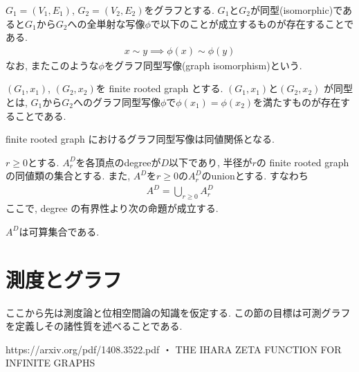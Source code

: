\documentclass[11pt, a4paper, dvipdfmx]{jsarticle}
\theoremstyle{definition}
\newtheorem*[S]{Definition+}[Axiom+]{Definition}
\newtheorem[S]{Theorem+}[Axiom+]{Theorem}
\newtheorem[S]{Proposition+}[Axiom+]{Proposition}
\newtheorem[S]{newch+}{Newcharactor}
\begin{document}
\begin{Definition+}[グラフの同型]
    $G_{1} = (V_{1}, E_{1})$, $G_{2} = (V_{2}, E_{2})$をグラフとする.
    $G_{1}$と$G_{2}$が同型(isomorphic)であると$G_{1}$から$G_{2}$への全単射な写像$\phi$で以下のことが成立するものが存在することである.
    \begin{align*}
        x\sim y\implies \phi(x)\sim \phi(y)
    \end{align*}
    なお, またこのような$\phi$をグラフ同型写像(graph isomorphism)という.
\end{Definition+}
\begin{Definition+}
    $(G_{1}, x_{1})$, $(G_{2}, x_{2})$を finite rooted graph とする. $(G_{1}, x_{1})$と$(G_{2}, x_{2})$
    が同型とは, $G_{1}$から$G_{2}$へのグラフ同型写像$\phi$で$\phi(x_{1}) = \phi(x_{2})$を満たすものが存在することである.
\end{Definition+}
\begin{Theorem+}
    finite rooted graph におけるグラフ同型写像は同値関係となる.
\end{Theorem+}
$r\geq 0$とする. $A_{r}^{D}$を各頂点のdegreeが$D$以下であり, 半径が$r$の finite rooted graph の同値類の集合とする.
また, $A^{D}$を$r\geq 0$の$A_{r}^{D}$のunionとする. すなわち
\begin{align*}
    A^{D} = \bigcup_{r\geq 0} A_{r}^{D}
\end{align*}
ここで, degree の有界性より次の命題が成立する.
\begin{Proposition+}
    $A^{D}$は可算集合である.
\end{Proposition+}
\newpage
\section{測度とグラフ}
ここから先は測度論と位相空間論の知識を仮定する. この節の目標は可測グラフを定義しその諸性質を述べることである.
\begin{thebibliography}{10}
     https://arxiv.org/pdf/1408.3522.pdf ・ THE IHARA ZETA FUNCTION FOR INFINITE GRAPHS 
\end{thebibliography}
\end{document}
